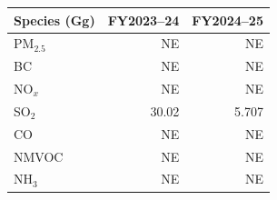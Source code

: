 \begin{tabular}{@{}lrr@{}}\toprule
Species (Gg) & FY2023--24 & FY2024--25\\\midrule
PM$_{2.5}$ & NE & NE \\
BC & NE & NE \\
NO$_x$ & NE & NE \\
SO$_2$ & 30.02 & 5.707 \\
CO & NE & NE \\
NMVOC & NE & NE \\
NH$_3$ & NE & NE \\
\bottomrule\end{tabular}
